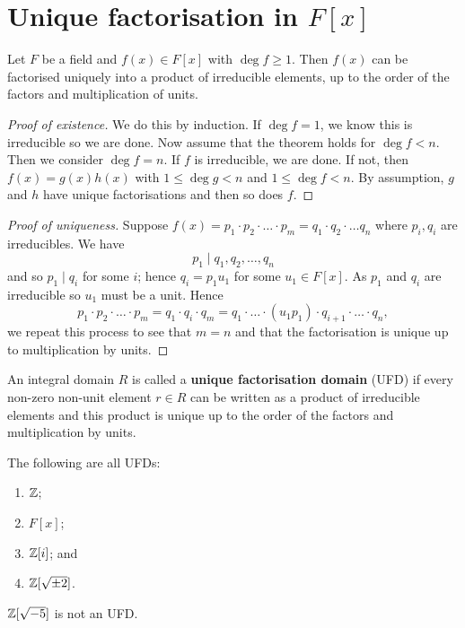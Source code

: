 \section{Unique factorisation in $F[x]$}

\begin{theorem}[]
    Let $F$ be a field and $f(x) \in F[x]$ with $\deg{f} \geq 1$. Then $f(x)$ can be factorised uniquely into a product of irreducible elements, up to the order of the factors and multiplication of units.
\end{theorem}

\begin{proof}[Proof of existence]
    We do this by induction. If $\deg{f} = 1$, we know this is irreducible so we are done. Now assume that the theorem holds for $\deg{f} < n$. Then we consider $\deg{f} = n$. If $f$ is irreducible, we are done. If not, then $f(x) = g(x) h(x)$ with $1 \leq \deg g < n$ and $1 \leq \deg f < n$. By assumption, $g$ and $h$ have unique factorisations and then so does $f$.
\end{proof}

\begin{proof}[Proof of uniqueness]
    Suppose $f(x) = p_1 \cdot p_2 \cdot \ldots \cdot p_m = q_1 \cdot q_2 \cdot \ldots q_n$ where $p_i, q_i$ are irreducibles. We have
    \[ p_1 \mid q_1, q_2, \ldots, q_n \]
    and so $p_1 \mid q_i$ for some $i$; hence $q_i = p_1 u_1$ for some $u_1 \in F[x]$. As $p_1$ and $q_i$ are irreducible so $u_1$ must be a unit. Hence
    \[ p_1 \cdot p_2 \cdot \ldots \cdot p_m = q_1 \cdot q_i \cdot q_m = q_1 \cdot \ldots \cdot (u_1 p_1) \cdot q_{i + 1} \cdot \ldots \cdot q_n, \]
    we repeat this process to see that $m = n$ and that the factorisation is unique up to multiplication by units.
\end{proof}

\begin{definition}
    An integral domain $R$ is called a \textbf{unique factorisation domain} (UFD) if every non-zero non-unit element $r \in R$ can be written as a product of irreducible elements and this product is unique up to the order of the factors and multiplication by units.
\end{definition}

\begin{example}
    The following are all UFDs:
    \begin{enumerate}
        \item $\mathbb{Z}$;
        \item $F[x]$;
        \item $\mathbb{Z}[i]$; and
        \item $\mathbb{Z}[\sqrt{\pm2}]$.
    \end{enumerate}
    $\mathbb{Z}[\sqrt{-5}]$ is not an UFD.
\end{example}


